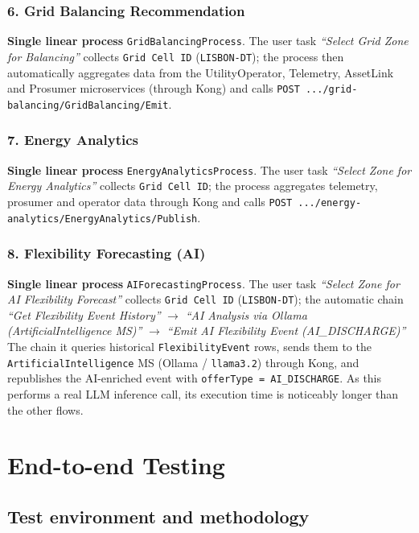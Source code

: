 \documentclass[11pt,a4paper]{article}
\begin{document}
\subsubsection*{6. Grid Balancing Recommendation}
\textbf{Single linear process} \texttt{GridBalancingProcess}. The user task
\emph{``Select Grid Zone for Balancing''} collects \texttt{Grid Cell ID}
(\texttt{LISBON-DT}); the process then automatically aggregates data from the
UtilityOperator, Telemetry, AssetLink and Prosumer microservices (through
Kong) and calls \texttt{POST .../grid-balancing/GridBalancing/Emit}.
 
\subsubsection*{7. Energy Analytics}
\textbf{Single linear process} \texttt{EnergyAnalyticsProcess}. The user task
\emph{``Select Zone for Energy Analytics''} collects \texttt{Grid Cell ID};
the process aggregates telemetry, prosumer and operator data through Kong and
calls \texttt{POST .../energy-analytics/EnergyAnalytics/Publish}.
 
\subsubsection*{8. Flexibility Forecasting (AI)}
\textbf{Single linear process} \texttt{AIForecastingProcess}. The user task
\emph{``Select Zone for AI Flexibility Forecast''} collects \texttt{Grid Cell
ID} (\texttt{LISBON-DT}); the automatic chain \emph{``Get Flexibility Event
History''} $\rightarrow$ \emph{``AI Analysis via Ollama (ArtificialIntelligence
MS)''} $\rightarrow$ \emph{``Emit AI Flexibility Event (AI\_DISCHARGE)''} The chain it queries historical \texttt{FlexibilityEvent} rows,
sends them to the \texttt{ArtificialIntelligence} MS (Ollama / \texttt{llama3.2})
through Kong, and republishes the AI-enriched event with
\texttt{offerType = AI\_DISCHARGE}. As this performs a real LLM inference call,
its execution time is noticeably longer than the other flows.
 
\section{End-to-end Testing}
\label{sec:testing}
 
\subsection{Test environment and methodology}
 
\end{document}
